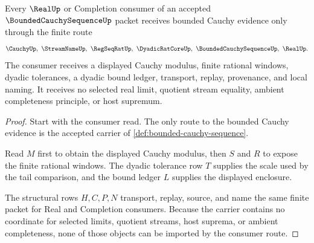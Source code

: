 \begin{theorem}
\label{thm:bounded-cauchy-sequence-real-completion-route}
Every $\RealUp$ or Completion consumer of an accepted $\BoundedCauchySequenceUp$ packet receives bounded Cauchy evidence only through the finite route
$$
\CauchyUp,\ \StreamNameUp,\ \RegSeqRatUp,\ \DyadicRatCoreUp,\ \BoundedCauchySequenceUp,\ \RealUp .
$$
The consumer receives a displayed Cauchy modulus, finite rational windows, dyadic tolerances, a dyadic bound ledger, transport, replay, provenance, and local naming. It receives no selected real limit, quotient stream equality, ambient completeness principle, or host supremum.
\end{theorem}
\begin{proof}
Start with the consumer read. The only route to the bounded Cauchy evidence is the accepted carrier of \autoref{def:bounded-cauchy-sequence}.

Read $M$ first to obtain the displayed Cauchy modulus, then $S$ and $R$ to expose the finite rational windows. The dyadic tolerance row $T$ supplies the scale used by the tail comparison, and the bound ledger $L$ supplies the displayed enclosure.

The structural rows $H,C,P,N$ transport, replay, source, and name the same finite packet for Real and Completion consumers. Because the carrier contains no coordinate for selected limits, quotient streams, host suprema, or ambient completeness, none of those objects can be imported by the consumer route.
\end{proof}


\begin{closurestatus}{\BoundedCauchySequenceUp}
  \theoryclosure{\seedClosure}
  \formalstatus{\unformalizedV}
\end{closurestatus}
